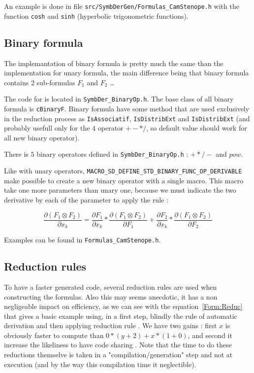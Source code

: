 An example is done in file {\tt src/SymbDerGen/Formulas\_CamStenope.h} with the function
{\tt cosh} and {\tt sinh}  (hyperbolic trigonometric functions).


\subsection{Binary formula}

The implemantation of binary formula is pretty much the same than the implementation for unary formula,
the main difference being that binary formula contains 2 sub-formulas $F_1$ and $F_2$ \dots

The code for is located in {\tt SymbDer\_BinaryOp.h}.  The base class of all binary formula is
{\tt cBinaryF}.  Binary formula have some method that are used exclusively in the reduction process 
as {\tt IsAssociatif},  {\tt IsDistribExt} and {\tt IsDistribExt}  (and probably usefull only
for the $4$ operator $+-*/$, so default value should work for all new binary operator).

There is $5$ binary operators defined in  {\tt SymbDer\_BinaryOp.h} : $+*/-$ and $pow$.

Like with unary operators, {\tt MACRO\_SD\_DEFINE\_STD\_BINARY\_FUNC\_OP\_DERIVABLE}
make possible to create a new binary operator with a single macro.
This macro take one more parameters than unary one, because  we must indicate the two
derivative by each of the parameter to apply the rule :

\begin{equation}
        \frac{\partial (F_1 \otimes F_2)} {\partial x_k} 
     =   \frac{\partial F_1 } {\partial x_k} * \frac{\partial (F_1 \otimes F_2)} {\partial F_1} 
       + \frac{\partial F_2 } {\partial x_k} * \frac{\partial (F_1 \otimes F_2)} {\partial F_2} 
\end{equation}

Examples can be found in {\tt Formulas\_CamStenope.h}.



\subsection{Reduction rules}

\label{Reduc:Rule}

To have a faster generated code, several reduction rules are used when 
constructing the formulas. Also this may seems anecdotic,
it has a non negligeable  impact on efficiency, as we can see with the equation~\ref{Form:Reduc}
that gives a basic example using, in a first step, blindly the 
rule of automatic derivation and then applying reduction rule .
We have two gains : first $x$ is obviously faster to compute than $0 * (y+2) + x * (1 + 0)$,
and second it increase the likeliness to have code sharing . Note that the time to do
these reductions themselve is taken in a "compilation/generation" step and not at execution
(and by the way this compilation time it neglectible).

